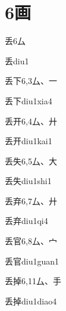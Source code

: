 
\section*{6画}

\begin{entry}{丢}{6}{⼛}
  \begin{phonetics}{丢}{diu1}
  \end{phonetics}
\end{entry}

\begin{entry}{丢下}{6,3}{⼛、⼀}
  \begin{phonetics}{丢下}{diu1xia4}
  \end{phonetics}
\end{entry}

\begin{entry}{丢开}{6,4}{⼛、⼶}
  \begin{phonetics}{丢开}{diu1kai1}
  \end{phonetics}
\end{entry}

\begin{entry}{丢失}{6,5}{⼛、⼤}
  \begin{phonetics}{丢失}{diu1shi1}
  \end{phonetics}
\end{entry}

\begin{entry}{丢弃}{6,7}{⼛、⼶}
  \begin{phonetics}{丢弃}{diu1qi4}
  \end{phonetics}
\end{entry}

\begin{entry}{丢官}{6,8}{⼛、⼧}
  \begin{phonetics}{丢官}{diu1guan1}
  \end{phonetics}
\end{entry}

\begin{entry}{丢掉}{6,11}{⼛、⼿}
  \begin{phonetics}{丢掉}{diu1diao4}
  \end{phonetics}
\end{entry}

